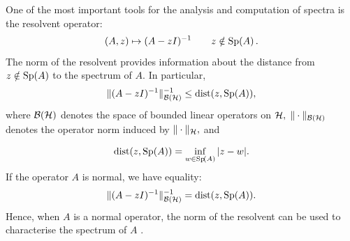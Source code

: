  One of the most important tools for the analysis and computation of spectra is the resolvent operator:
\begin{equation}\label{resolvant}
    (A, z) \mapsto (A-zI)^{-1} \qquad z \notin \operatorname{Sp}\!\left(A\right).
\end{equation}
The norm of the resolvent provides information about the distance from $z\notin \operatorname{Sp}\!\left(A\right)$ to the spectrum of $A.$ In particular,
\begin{equation}
    \| (A-zI)^{-1} \|_{\mathcal{B}(\mathcal{H})}^{-1} \le \operatorname{dist}(z, \operatorname{Sp}\!\left(A\right)), 
\end{equation}
where  $\mathcal{B}(\mathcal{H})$ denotes the space of bounded linear operators on $\mathcal{H},$ $\|\cdot\|_{\mathcal{B}(\mathcal{H})}$ denotes the operator norm induced by $\|\cdot \|_{\mathcal{H}},$ and 


\begin{equation}
    \operatorname{dist}(z, \operatorname{Sp}\!\left(A\right)) = \inf_{w \in \operatorname{Sp}\!\left(A\right)} |z - w|.
\end{equation}
If the operator $A$ is normal, we have equality:
\begin{equation}
    \| (A-zI)^{-1} \|_{\mathcal{B}(\mathcal{H})}^{-1} = \operatorname{dist}(z, \operatorname{Sp}\!\left(A\right)). 
\end{equation}
Hence, when $A$ is a normal operator, the norm of the resolvent can be used to characterise the spectrum of $A$ \cite[Section~1.3.2]{Matt}.





